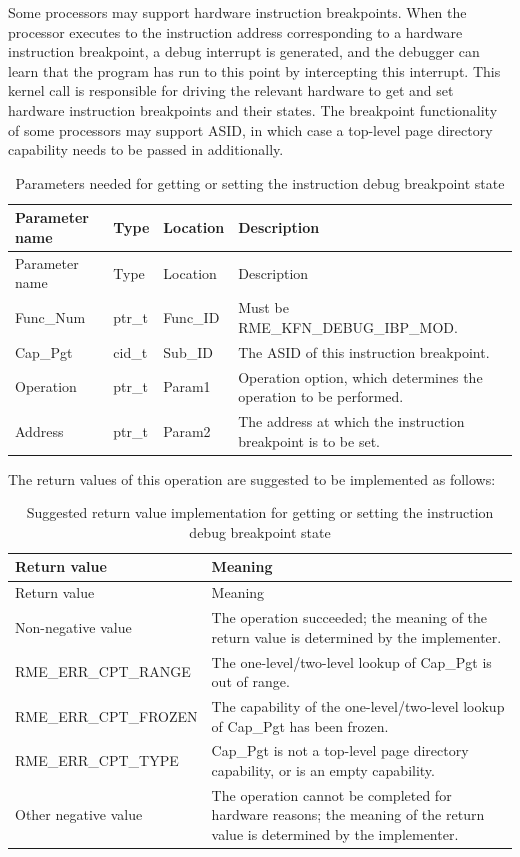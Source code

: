 Some processors may support hardware instruction breakpoints. When the processor executes to the instruction address corresponding to a hardware instruction breakpoint, a debug interrupt is generated, and the debugger can learn that the program has run to this point by intercepting this interrupt. This kernel call is responsible for driving the relevant hardware to get and set hardware instruction breakpoints and their states. The breakpoint functionality of some processors may support ASID, in which case a top-level page directory capability needs to be passed in additionally.

\begin{xltabular}{\textwidth}{@{}>{\hsize\raggedright\arraybackslash}X>{\hsize\raggedright\arraybackslash}X>{\hsize\raggedright\arraybackslash}X>{\hsize\raggedright\arraybackslash}X@{}}
\caption{Parameters needed for getting or setting the instruction debug breakpoint state}\label{tab:8-119-get-or-set-instruction-breakpoint-state-parameters}\\
\toprule
Parameter name & Type & Location & Description\tabularnewline
\endfirsthead
\toprule
Parameter name & Type & Location & Description\tabularnewline
\midrule
\endhead
\bottomrule
\endlastfoot
Func\_Num & ptr\_t & Func\_ID & Must be RME\_KFN\_DEBUG\_IBP\_MOD.\tabularnewline
Cap\_Pgt & cid\_t & Sub\_ID & The ASID of this instruction breakpoint.\tabularnewline
Operation & ptr\_t & Param1 &
Operation option, which determines the operation to be performed.\tabularnewline
Address & ptr\_t & Param2 & The address at which the instruction breakpoint is to be set.\tabularnewline
\end{xltabular}
\nopagebreak[4]

The return values of this operation are suggested to be implemented as follows:

\begin{xltabular}{\textwidth}{@{}>{\hsize\raggedright\arraybackslash}X>{\hsize\raggedright\arraybackslash}X@{}}
\caption{Suggested return value implementation for getting or setting the instruction debug breakpoint state}\label{tab:8-120-get-or-set-instruction-breakpoint-state-suggested-return-values}\\
\toprule
Return value & Meaning\tabularnewline
\endfirsthead
\toprule
Return value & Meaning\tabularnewline
\midrule
\endhead
\bottomrule
\endlastfoot
    Non-negative value & The operation succeeded; the meaning of the return value is determined by the implementer.\tabularnewline
    RME\_ERR\_CPT\_RANGE & The one-level/two-level lookup of Cap\_Pgt is out of range.\tabularnewline
    RME\_ERR\_CPT\_FROZEN & The capability of the one-level/two-level lookup of Cap\_Pgt has been frozen.\tabularnewline
    RME\_ERR\_CPT\_TYPE & Cap\_Pgt is not a top-level page directory capability, or is an empty capability.\tabularnewline
    Other negative value & The operation cannot be completed for hardware reasons; the meaning of the return value is determined by the implementer.\tabularnewline
\end{xltabular}
\nopagebreak[4]


